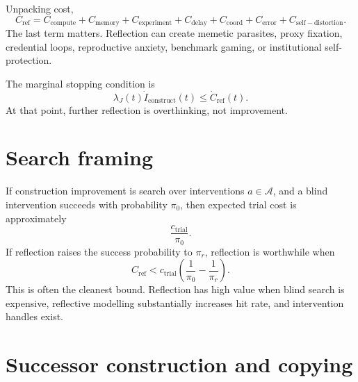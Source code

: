 \documentclass[11pt]{article}
\begin{document}
Unpacking cost,
\begin{equation}
  C_{\mathrm{ref}}=
  C_{\mathrm{compute}}+C_{\mathrm{memory}}+C_{\mathrm{experiment}}+C_{\mathrm{delay}}+C_{\mathrm{coord}}+C_{\mathrm{error}}+C_{\mathrm{self-distortion}}.
\end{equation}
The last term matters. Reflection can create memetic parasites, proxy fixation, credential loops, reproductive anxiety, benchmark gaming, or institutional self-protection.

The marginal stopping condition is
\begin{equation}
  \lambda_J(t)\dot I_{\mathrm{construct}}(t)\le \dot C_{\mathrm{ref}}(t).
\end{equation}
At that point, further reflection is overthinking, not improvement.

\section{Search framing}

If construction improvement is search over interventions $a\in\mathcal A$, and a blind intervention succeeds with probability $\pi_0$, then expected trial cost is approximately
\begin{equation}
  \frac{c_{\mathrm{trial}}}{\pi_0}.
\end{equation}
If reflection raises the success probability to $\pi_r$, reflection is worthwhile when
\begin{equation}
  C_{\mathrm{ref}}<c_{\mathrm{trial}}\left(\frac{1}{\pi_0}-\frac{1}{\pi_r}\right).
\end{equation}
This is often the cleanest bound. Reflection has high value when blind search is expensive, reflective modelling substantially increases hit rate, and intervention handles exist.

\section{Successor construction and copying}
\end{document}
